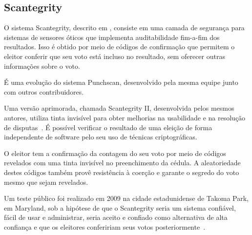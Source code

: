 \subsection{Scantegrity}

O sistema Scantegrity, descrito em \textcite{chaum2008scantegrity}, consiste em uma camada de segurança para sistemas de sensores óticos que implementa auditabilidade fim-a-fim dos resultados. Isso é obtido por meio de códigos de confirmação que permitem o eleitor conferir que seu voto está incluso no resultado, sem oferecer outras informações sobre o voto.

É uma evolução do sistema Punchscan, desenvolvido pela mesma equipe junto com outros contribuidores.

Uma versão aprimorada, chamada Scantegrity II, desenvolvida pelos mesmos autores, utiliza tinta invisível para obter melhorias na usabilidade e na resolução de disputas~\cite{chaum2008scantegrityII}. É possível verificar o resultado de uma eleição de forma independente de software pelo seu uso de técnicas criptográficas.

O eleitor tem a confirmação da contagem do seu voto por meio de códigos revelados com uma tinta invisível no preenchimento da cédula. A aleatoriedade destes códigos também provê resistência à coerção e garante o segredo do voto mesmo que sejam revelados.

Um teste público foi realizado em 2009 na cidade estadunidense de Takoma Park, em Maryland, sob a hipótese de que o Scantegrity seria um sistema confiável, fácil de usar e administrar, seria aceito e confiado como alternativa de alta confiança e que os eleitores confeririam seus votos posteriormente~\cite{sherman2010scantegrity}.